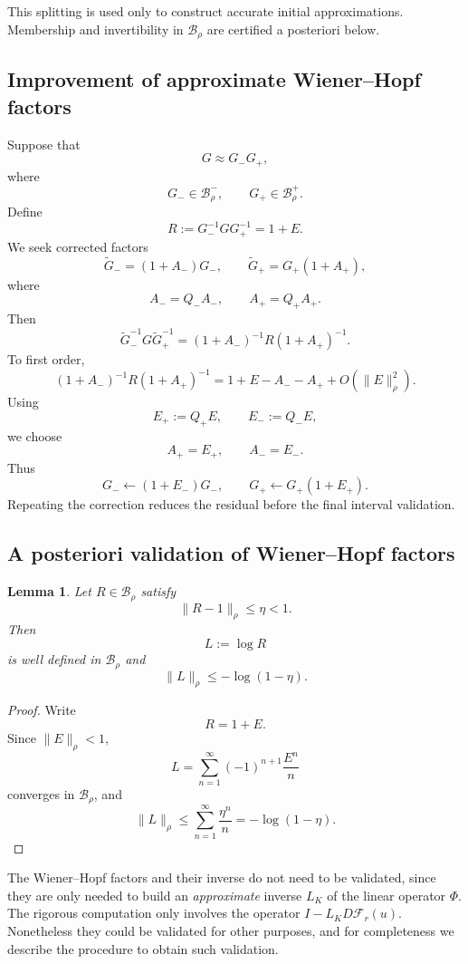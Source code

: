 \documentclass[11pt,a4paper]{amsart}
\newtheorem{lemma}[theorem]{Lemma}
\begin{document}
This splitting is used only to construct accurate initial
approximations. Membership and invertibility in $\mathcal B_\rho$ are
certified a posteriori below.


\subsection{Improvement of approximate Wiener--Hopf factors}

Suppose that
\[
G\approx G_-G_+,
\]
where
\[
G_-\in\mathcal B_\rho^-,
\qquad
G_+\in\mathcal B_\rho^+.
\]
Define
\[
R
:=
G_-^{-1}GG_+^{-1}
=
1+E.
\]
We seek corrected factors
\[
\widetilde G_-
=
(1+A_-)G_-,
\qquad
\widetilde G_+
=
G_+(1+A_+),
\]
where
\[
A_-=Q_-A_-,
\qquad
A_+=Q_+A_+.
\]
Then
\[
\widetilde G_-^{-1}
G
\widetilde G_+^{-1}
=
(1+A_-)^{-1}
R
(1+A_+)^{-1}.
\]
To first order,
\[
(1+A_-)^{-1}
R
(1+A_+)^{-1}
=
1+E-A_--A_+
+
O(\|E\|_\rho^2).
\]
Using
\[
E_+:=Q_+E,
\qquad
E_-:=Q_-E,
\]
we choose
\[
A_+=E_+,
\qquad
A_-=E_-.
\]
Thus
\[
G_-\leftarrow(1+E_-)G_-,
\qquad
G_+\leftarrow G_+(1+E_+).
\]
Repeating the correction reduces the residual before the final
interval validation.


\subsection{A posteriori validation of Wiener--Hopf factors}

\begin{lemma}\label{lem:WHlog}
	Let $R\in\mathcal B_\rho$ satisfy
	\[
	\|R-1\|_\rho\le\eta<1.
	\]
	Then
	\[
	L:=\log R
	\]
	is well defined in $\mathcal B_\rho$ and
	\[
	\|L\|_\rho
	\le
	-\log(1-\eta).
	\]
\end{lemma}

\begin{proof}
	Write
	\[
	R=1+E.
	\]
	Since $\|E\|_\rho<1$,
	\[
	L
	=
	\sum_{n=1}^{\infty}
	(-1)^{n+1}\frac{E^n}{n}
	\]
	converges in $\mathcal B_\rho$, and
	\[
	\|L\|_\rho
	\le
	\sum_{n=1}^{\infty}\frac{\eta^n}{n}
	=
	-\log(1-\eta).
	\]
\end{proof}

The Wiener--Hopf factors and their inverse do not need to be validated, since they are only needed to build an {\em approximate} inverse $L_K$ of the linear operator $\Phi$. The rigorous computation only involves the operator $I-L_K D\mathcal F_r(u)$. Nonetheless they could be validated for other purposes, and for completeness we describe the procedure to obtain such validation.
\end{document}
